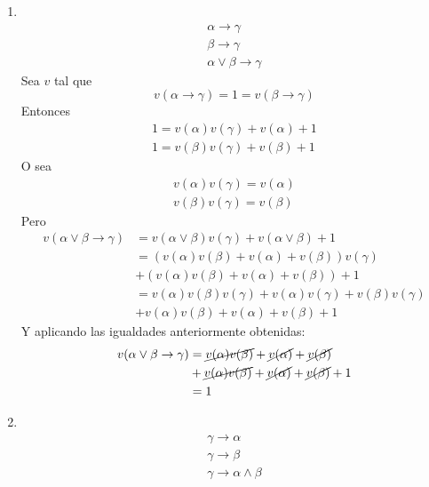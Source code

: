 \begin{ejercicio*}
\begin{enumerate}
\item \ 
    \begin{equation*}
        \begin{array}{c}
            \alpha\rightarrow\gamma \\
            \beta\rightarrow\gamma \\
            \hline
            \alpha\lor\beta\rightarrow\gamma
        \end{array}
    \end{equation*}
    Sea $v$ tal que 
    \begin{equation*}
        v(\alpha\rightarrow\gamma)=1=v(\beta\rightarrow\gamma)
    \end{equation*}
    Entonces
    \begin{gather*}
        1=v(\alpha)v(\gamma)+v(\alpha)+1 \\
        1 = v(\beta)v(\gamma)+v(\beta)+1
    \end{gather*}
    O sea
    \begin{gather*}
        v(\alpha)v(\gamma) = v(\alpha) \\
        v(\beta)v(\gamma) = v(\beta)
    \end{gather*}
    Pero
    \begin{align*}
        v(\alpha\lor\beta\rightarrow\gamma) &= v(\alpha\lor\beta)v(\gamma)+v(\alpha\lor\beta)+1 \\
                                            &= (v(\alpha)v(\beta)+v(\alpha)+v(\beta))v(\gamma) \\
                                            &+ (v(\alpha)v(\beta)+v(\alpha)+v(\beta)) + 1 \\
                                            &= v(\alpha)v(\beta)v(\gamma)+v(\alpha)v(\gamma) + v(\beta)v(\gamma) \\
                                            &+ v(\alpha)v(\beta)+v(\alpha)+v(\beta) + 1
    \end{align*}
    Y aplicando las igualdades anteriormente obtenidas:
    \begin{align*}
        v(\alpha\lor\beta\rightarrow\gamma) &= \cancel{v(\alpha)v(\beta)} + \cancel{v(\alpha)} + \cancel{v(\beta)} \\
                                            &+ \cancel{v(\alpha)v(\beta)}+\cancel{v(\alpha)}+\cancel{v(\beta)} +1\\
                                            &= 1
    \end{align*}

    \item \ 
        \begin{equation*}
            \begin{array}{c}
                \gamma\rightarrow\alpha \\
                \gamma \rightarrow\beta \\
                \hline
                \gamma\rightarrow\alpha\land\beta
            \end{array}
        \end{equation*}


\end{enumerate}
\end{ejercicio*}
